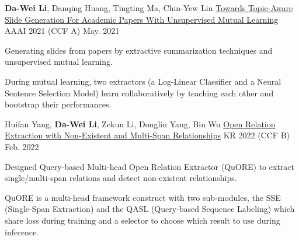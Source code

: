 

\begin{cventries}

  \cventry
    {\textbf{Da-Wei Li}, Danqing Huang, Tingting Ma, Chin-Yew Lin} %
    {\href{https://www.microsoft.com/en-us/research/publication/towards-topic-aware-slide-generation-for-academic-papers-with-unsupervised-mutual-learning/}{Towards Topic-Aware Slide Generation For Academic Papers With Unsupervised Mutual Learning}} %
    {AAAI 2021 (CCF A)} %
    {May. 2021} %
    {
      \begin{cvitems} %
        \item {Generating slides from papers by extractive summarization techniques and unsupervised mutual learning.}
        \item {During mutual learning, two extractors (a Log-Linear Classifier and a Neural Sentence Selection Model) learn collaboratively by teaching each other and bootstrap their performances.}
      \end{cvitems}
    }

  \cventry
    {Huifan Yang, \textbf{Da-Wei Li}, Zekun Li, Donglin Yang, Bin Wu} %
    {\href{https://www.easychair.org/publications/preprint_open/jz3j}{Open Relation Extraction with Non-Existent and Multi-Span Relationships}} %
    {KR 2022 (CCF B)} %
    {Feb. 2022} %
    {
      \begin{cvitems} %
        \item {Designed Query-based Multi-head Open Relation Extractor (QuORE) to extract single/multi-span relations and detect non-existent relationships.}
        \item {QuORE is a multi-head framework construct with two sub-modules, the SSE (Single-Span Extraction) and the QASL (Query-based Sequence Labeling) which share loss during training and a selector to choose which result to use during inference.}
      \end{cvitems}
    }


\end{cventries}
